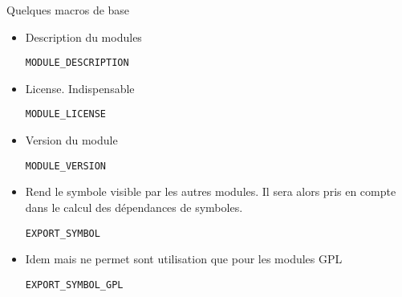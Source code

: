 \begin{frame}[fragile=singleslide]{Quelques macros de base}
  \begin{itemize} 
  \item Description du modules
    \begin{lstlisting}
MODULE_DESCRIPTION
    \end{lstlisting}
  \item License. Indispensable
    \begin{lstlisting}
MODULE_LICENSE
    \end{lstlisting}
  \item Version du module
    \begin{lstlisting}
MODULE_VERSION
    \end{lstlisting}
  \item Rend le symbole visible par les autres modules.  Il sera alors
    pris en compte dans le calcul des dépendances de symboles.
    \begin{lstlisting}
EXPORT_SYMBOL
    \end{lstlisting} 
  \item Idem  mais  ne permet sont utilisation que
    pour les modules GPL
    \begin{lstlisting}
EXPORT_SYMBOL_GPL
    \end{lstlisting} 
  \end{itemize}
\end{frame}

